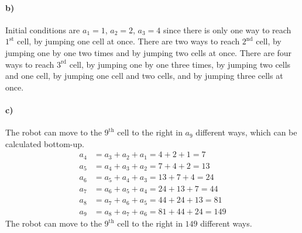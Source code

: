 \documentclass[12pt]{article}
\newcommand{\+}{\mkern2mu}
\begin{document}
\paragraph{b)}
Initial conditions are $a_1 = 1$, $a_2 = 2$, $a_3 = 4$ since there is only one way to reach $1^\text{st}$ cell, by jumping one cell at once. There are two ways to reach $2^\text{nd}$ cell, by jumping one by one two times and by jumping two cells at once. There are four ways to reach $3^\text{rd}$ cell, by jumping one by one three times, by jumping two cells and one cell, by jumping one cell and two cells, and by jumping three cells at once.

\paragraph{c)}
The robot can move to the $9^\text{th}$ cell to the right in $a_9$ different ways, which can be calculated bottom-up.
\begin{align*}
    a_4 &= a_3 + a_2 + a_1 = 4 + 2 + 1 = 7 \\
    a_5 &= a_4 + a_3 + a_2 = 7 + 4 + 2 = 13 \\
    a_6 &= a_5 + a_4 + a_3 = 13 + 7 + 4 = 24 \\
    a_7 &= a_6 + a_5 + a_4 = 24 + 13 + 7 = 44 \\
    a_8 &= a_7 + a_6 + a_5 = 44 + 24 + 13 = 81 \\
    a_9 &= a_8 + a_7 + a_6 = 81 + 44 + 24 = 149
\end{align*}
The robot can move to the $9^\text{th}$ cell to the right in $149$ different ways.
\end{document}
